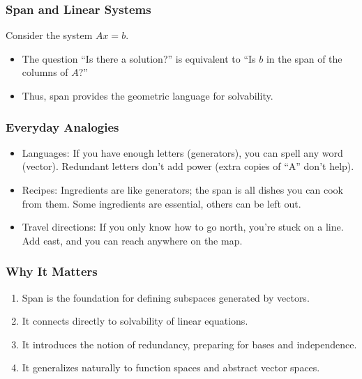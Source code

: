 \documentclass[
  letterpaper,
  DIV=11,
  numbers=noendperiod]{scrreprt}
\providecommand{\tightlist}{%
  \setlength{\itemsep}{0pt}\setlength{\parskip}{0pt}}
\begin{document}
\subsubsection{Span and Linear Systems}\label{span-and-linear-systems}

Consider the system \(Ax=b\).

\begin{itemize}
\tightlist
\item
  The question ``Is there a solution?'' is equivalent to ``Is \(b\) in
  the span of the columns of \(A\)?''
\item
  Thus, span provides the geometric language for solvability.
\end{itemize}

\subsubsection{Everyday Analogies}\label{everyday-analogies-29}

\begin{itemize}
\tightlist
\item
  Languages: If you have enough letters (generators), you can spell any
  word (vector). Redundant letters don't add power (extra copies of
  ``A'' don't help).
\item
  Recipes: Ingredients are like generators; the span is all dishes you
  can cook from them. Some ingredients are essential, others can be left
  out.
\item
  Travel directions: If you only know how to go north, you're stuck on a
  line. Add east, and you can reach anywhere on the map.
\end{itemize}

\subsubsection{Why It Matters}\label{why-it-matters-29}

\begin{enumerate}
\def\labelenumi{\arabic{enumi}.}
\tightlist
\item
  Span is the foundation for defining subspaces generated by vectors.
\item
  It connects directly to solvability of linear equations.
\item
  It introduces the notion of redundancy, preparing for bases and
  independence.
\item
  It generalizes naturally to function spaces and abstract vector
  spaces.
\end{enumerate}
\end{document}
